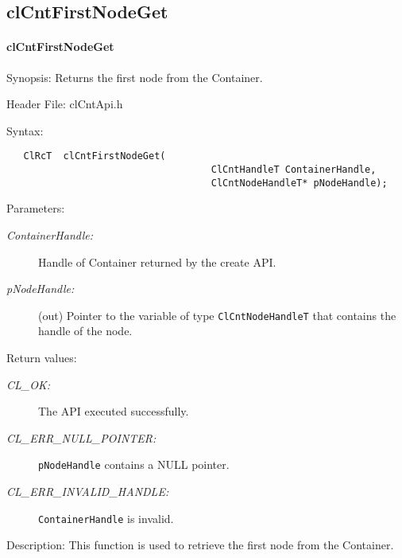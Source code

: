 \subsection{clCntFirstNodeGet}
\hypertarget{pagecnt110}{}\paragraph{cl\-Cnt\-First\-Node\-Get}\label{pagecnt110}
\begin{Desc}
\item[Synopsis:]Returns the first node from the Container.\end{Desc}
\begin{Desc}
\item[Header File:]clCntApi.h\end{Desc}
\begin{Desc}
\item[Syntax:]

\footnotesize\begin{verbatim}   ClRcT  clCntFirstNodeGet(
                               		ClCntHandleT ContainerHandle,
                               		ClCntNodeHandleT* pNodeHandle);
\end{verbatim}
\normalsize
\end{Desc}
\begin{Desc}
\item[Parameters:]
\begin{description}
\item[{\em Container\-Handle:}]Handle of Container returned by the create API. 
\item[{\em p\-Node\-Handle:}](out) Pointer to the variable of type {\tt{Cl\-Cnt\-Node\-Handle\-T}} that contains 
the handle of the node.
\end{description}
\end{Desc}
\begin{Desc}
\item[Return values:]
\begin{description}
\item[{\em CL\_\-OK:}]The API executed successfully. 
\item[{\em CL\_\-ERR\_\-NULL\_\-POINTER:}] {\tt{pNodeHandle}} contains a NULL pointer.
\item[{\em CL\_\-ERR\_\-INVALID\_\-HANDLE:}] {\tt{ContainerHandle}} is invalid.
\end{description}
\end{Desc}
\begin{Desc}
\item[Description:]This function is used to retrieve the first node from the Container.\end{Desc}
